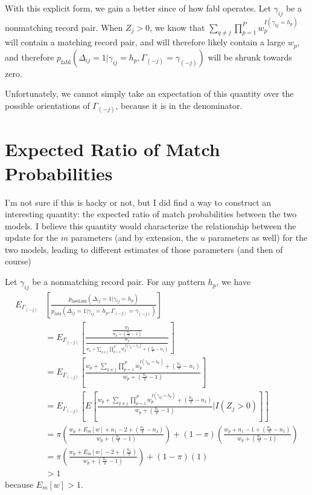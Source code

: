 \documentclass[12pt,letterpaper]{article}
\newcommand{\1}[1]{\mathbb{I}\!\left[#1\right]} %
\begin{document}
With this explicit form, we gain a better since of how fabl operates. Let $\gamma_{ij}$ be a nonmatching record pair. When $Z_j > 0$, we know that $\sum_{q \neq j} \prod_{p = 1}^P w_p^{I(\gamma_{qj} = h_p)}$ will contain a matching record pair, and will therefore likely contain a large $w_p$, and therefore $p_{\text{fabl}}(\Delta_{ij} = 1| \gamma_{ij} = h_p, \Gamma_{(-j)} = \gamma_{(-j)})$ will be shrunk towards zero. 

Unfortunately, we cannot simply take an expectation of this quantity over the possible orientations of $\Gamma_{(-j)}$, because it is in the denominator. 

\section{Expected Ratio of Match Probabilities}

I'm not sure if this is hacky or not, but I did find a way to construct an interesting quantity: the expected ratio of match probabilities between the two models. I believe this quantity would characterize the relationship between the update for the $m$ parameters (and by extension, the $u$ parameters as well) for the two models, leading to different estimates of those parameters (and then of course)

Let $\gamma_{ij}$ be a nonmatching record pair. For any pattern $h_p$, we have
\begin{align*}
	E_{\Gamma_{(-j)}}&\left[\frac{p_{\text{fastLink}}(\Delta_{ij} = 1| \gamma_{ij} = h_p)}{p_{\text{fabl}}(\Delta_{ij} = 1| \gamma_{ij} = h_p, \Gamma_{(-j)} = \gamma_{(-j)})}\right] \\
	&= E_{\Gamma_{(-j)}}\left[\frac{\frac{w_p}{w_p + (\frac{n_1}{\pi} - 1)}}{\frac{w_p}{w_p  + \sum_{q \neq j} \prod_{p = 1}^P w_p^{I(\gamma_{qj} = h_p)} + (\frac{n_1}{\pi} - n_1)}} \right] \\
	&= E_{\Gamma_{(-j)}}\left[\frac{w_p  + \sum_{q \neq j} \prod_{p = 1}^P w_p^{I(\gamma_{qj} = h_p)} + (\frac{n_1}{\pi} - n_1)}{w_p + (\frac{n_1}{\pi} - 1)} \right]\\
	&=	E_{\Gamma_{(-j)}}\left[E\left[\frac{w_p  + \sum_{q \neq j} \prod_{p = 1}^P w_p^{I(\gamma_{qj} = h_p)} + (\frac{n_1}{\pi} - n_1)}{w_p + (\frac{n_1}{\pi} - 1)} \Bigg| I(Z_j > 0) \right] \right]\\
	&=\pi \left(\frac{w_p  + E_m[w] + n_1 - 2 + (\frac{n_1}{\pi} - n_1)}{w_p + (\frac{n_1}{\pi} - 1)}\right) + (1-\pi)\left(\frac{w_p +  n_1 - 1 + (\frac{n_1}{\pi} - n_1)}{w_p + (\frac{n_1}{\pi} - 1)}\right) \\
	&= \pi \left(\frac{w_p  + E_m[w] - 2 + (\frac{n_1}{\pi})}{w_p + (\frac{n_1}{\pi} - 1)}\right) + (1-\pi)(1)\\
	&> 1
\end{align*}
because $E_m[w] > 1$.
\end{document}
